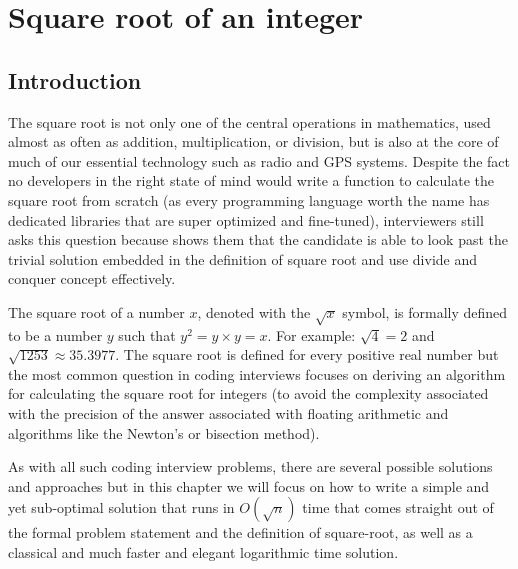 %


\chapter{Square root of an integer}
\label{ch:square_root}
\section*{Introduction}

The square root is not only one of the central operations in mathematics, used almost as often as addition, multiplication, or division, but is also at the core of much of our essential technology such as radio and GPS systems. 
Despite the fact no developers in the right state of mind would write a function to calculate the square root from scratch (as every programming language worth the name has dedicated libraries that are super optimized and fine-tuned), interviewers still asks this question because shows them that the candidate is able to look past the trivial solution embedded in the definition of square root and use divide and conquer concept effectively.


The square root of a number $x$, denoted with the $\sqrt{x}$ symbol, is formally defined to be a number $y$ such that $y^2 = y\times y=x$.
For example: $\sqrt{4} = 2$ and $\sqrt{1253} \approx 35.3977$.
The square root is defined for every positive real number but the most common question in coding interviews focuses on deriving an algorithm for calculating the square root for integers (to avoid the complexity associated with the precision of the answer associated with floating arithmetic and algorithms like the Newton's  or bisection method).

As with all such coding interview problems,  there are several possible solutions and approaches but in this chapter we will focus on how to write a simple and yet sub-optimal solution that runs in $O(\sqrt{n})$ time that comes straight out of the formal problem statement and the definition of square-root,
as well as a classical and much faster and elegant logarithmic time solution.


